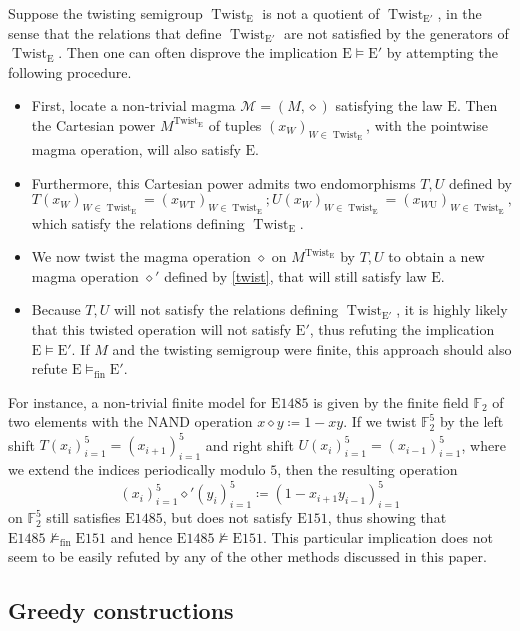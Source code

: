 \documentclass[12pt]{amsart}
\theoremstyle{definition}
\newcommand{\op}{\diamond}
\newcommand{\nmodels}{\not\models}
\newcommand{\modelsfin}{\models_{\mathrm{fin}}}
\newcommand{\nmodelsfin}{\nmodels_{\mathrm{fin}}}
\newcommand{\Magma}{{\mathcal{M}}}
\newcommand{\Eq}[1]{\mathrm{E}#1}
\newcommand{\E}{\mathrm{E}}
\begin{document}
Suppose the twisting semigroup $\operatorname{Twist}_\E$ is not a quotient of $\operatorname{Twist}_{{\E'}}$, in the sense that the relations that define $\operatorname{Twist}_{{\E'}}$ are not satisfied by the generators of $\operatorname{Twist}_\E$.  Then one can often disprove the implication $\E \models {\E'}$ by attempting the following procedure.
\begin{itemize}
\item First, locate a non-trivial magma $\Magma = (M,\op)$ satisfying the law $\E$.  Then the Cartesian power $M^{\operatorname{Twist}_\E}$ of tuples $(x_W)_{W \in \operatorname{Twist}_\E}$, with the pointwise magma operation, will also satisfy $\E$.
\item Furthermore, this Cartesian power admits two endomorphisms $T, U$ defined by
$$ T (x_W)_{W \in \operatorname{Twist}_\E} = (x_{W \mathrm{T}})_{W \in \operatorname{Twist}_\E};
U (x_W)_{W \in \operatorname{Twist}_\E} = (x_{W \mathrm{U}})_{W \in \operatorname{Twist}_\E},$$
which satisfy the relations defining $\operatorname{Twist}_\E$.
\item We now twist the magma operation $\op$ on $M^{\operatorname{Twist}_\E}$ by $T,U$ to obtain a new magma operation $\op'$ defined by \eqref{twist}, that will still satisfy law $\E$.
\item Because $T, U$ will not satisfy the relations defining $\operatorname{Twist}_{{\E'}}$, it is highly likely that this twisted operation will not satisfy ${\E'}$, thus refuting the implication $\E \models {\E'}$.  If $M$ and the twisting semigroup were finite, this approach should also refute $\E \modelsfin {\E'}$.
\end{itemize}

For instance, a non-trivial finite model for $\Eq{1485}$ is given by the finite field $\mathbb{F}_2$ of two elements with the NAND operation $x \op y \coloneqq 1-xy$.  If we twist $\mathbb{F}_2^5$ by the left shift $T(x_i)_{i=1}^5 = (x_{i+1})_{i=1}^5$ and right shift $U(x_i)_{i=1}^5 = (x_{i-1})_{i=1}^5$, where we extend the indices periodically modulo $5$, then the resulting operation
$$ (x_i)_{i=1}^5 \op' (y_i)_{i=1}^5 \coloneqq (1 - x_{i+1} y_{i-1})_{i=1}^5$$
on $\mathbb{F}_2^5$ still satisfies $\Eq{1485}$, but does not satisfy $\Eq{151}$, thus showing that $\Eq{1485} \nmodelsfin \Eq{151}$ and hence $\Eq{1485} \nmodels \Eq{151}$.  This particular implication does not seem to be easily refuted by any of the other methods discussed in this paper.

\subsection{Greedy constructions}\label{greedy-sec}
\end{document}
